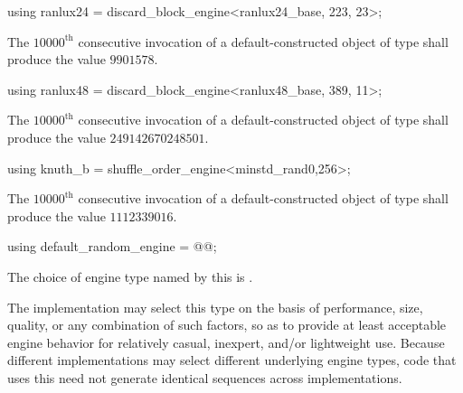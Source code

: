 %
%
\begin{itemdecl}
using ranlux24 = discard_block_engine<ranlux24_base, 223, 23>;
\end{itemdecl}

\begin{itemdescr}
\pnum\required
 The $10000^\text{th}$ consecutive invocation
 of a default-constructed object
 of type 
 shall produce the value
 $9901578$.
\end{itemdescr}

%
%
\begin{itemdecl}
using ranlux48 = discard_block_engine<ranlux48_base, 389, 11>;
\end{itemdecl}

\begin{itemdescr}
\pnum\required
 The $10000^\text{th}$ consecutive invocation
 of a default-constructed object
 of type 
 shall produce the value
 $249142670248501$.
\end{itemdescr}

%
%
\begin{itemdecl}
using knuth_b = shuffle_order_engine<minstd_rand0,256>;
\end{itemdecl}

\begin{itemdescr}
\pnum\required
 The $10000^\text{th}$ consecutive invocation
 of a default-constructed object
 of type 
 shall produce the value $1112339016$.
\end{itemdescr}%

%
%
\begin{itemdecl}
using default_random_engine = @\textit{}@;
\end{itemdecl}

\begin{itemdescr}
\pnum\remarks
The choice of engine type
named by this 
is .
\begin{note}
 The implementation
 may select this type
 on the basis of performance,
 size,
 quality,
 or any combination of such factors,
 so as to provide at least acceptable engine behavior
 for relatively casual, inexpert, and/or lightweight use.
 Because different implementations
 may select different underlying engine types,
 code that uses this 
 need not generate identical sequences across implementations.
\end{note}
\end{itemdescr}%
%
%


